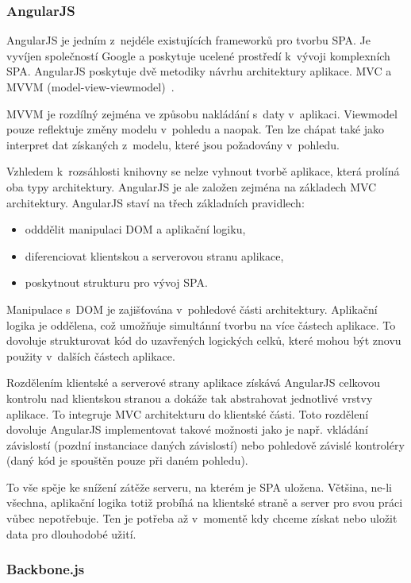 \subsubsection*{AngularJS}

AngularJS je jedním z~nejdéle existujících frameworků pro tvorbu SPA. Je vyvíjen společností Google a poskytuje ucelené prostředí k~vývoji komplexních SPA. AngularJS poskytuje dvě metodiky návrhu architektury aplikace. MVC a MVVM (model-view-viewmodel)~\cite{mvvm}.

MVVM je rozdílný zejména ve způsobu nakládání s~daty v~aplikaci. Viewmodel pouze reflektuje změny modelu v~pohledu a naopak. Ten lze chápat také jako interpret dat získaných z~modelu, které jsou požadovány v~pohledu.

Vzhledem k~rozsáhlosti knihovny se nelze vyhnout tvorbě aplikace, která prolíná oba typy architektury. AngularJS je ale založen zejména na základech MVC architektury. AngularJS staví na třech základních pravidlech:

\begin{itemize}
    \item odddělit manipulaci DOM a aplikační logiku,
    \item diferenciovat klientskou a serverovou stranu aplikace,
    \item poskytnout strukturu pro vývoj SPA.
\end{itemize}

Manipulace s~DOM je zajišťována v~pohledové části architektury. Aplikační logika je oddělena, což umožňuje simultánní tvorbu na více částech aplikace. To dovoluje strukturovat kód do uzavřených logických celků, které mohou být znovu použity v~dalších částech aplikace.

Rozdělením klientské a serverové strany aplikace získává AngularJS celkovou kontrolu nad klientskou stranou a dokáže tak abstrahovat jednotlivé vrstvy aplikace. To integruje MVC architekturu do klientské části. Toto rozdělení dovoluje AngularJS implementovat takové možnosti jako je např. vkládání závislostí (pozdní instanciace daných závislostí) nebo pohledově závislé kontroléry (daný kód je spouštěn pouze při daném pohledu).

To vše spěje ke snížení zátěže serveru, na kterém je SPA uložena. Většina, ne-li všechna, aplikační logika totiž probíhá na klientské straně a server pro svou práci vůbec nepotřebuje. Ten je potřeba až v~momentě kdy chceme získat nebo uložit data pro dlouhodobé užití.

\subsubsection*{Backbone.js}

